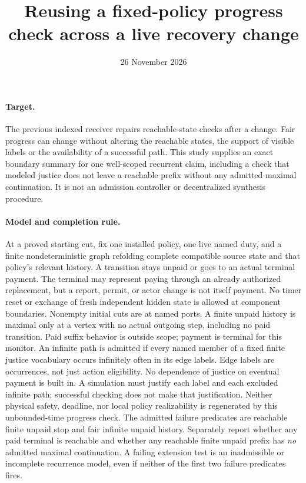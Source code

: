 \documentclass{article}
\title{Reusing a fixed-policy progress check across a live recovery change}
\date{26 November 2026}
\begin{document}
\maketitle
\paragraph{Target.}
The previous indexed receiver repairs reachable-state checks after a
change. Fair progress can change without altering the reachable states,
the support of visible labels or the availability of a successful path.
This study supplies an exact boundary summary for one well-scoped
recurrent claim, including a check that modeled justice does not leave a
reachable prefix without any admitted maximal continuation. It is not
an admission controller or decentralized synthesis procedure.

\paragraph{Model and completion rule.}
At a proved starting cut, fix one installed policy, one live named duty,
and a finite nondeterministic graph refolding complete compatible source
state and that policy's relevant history. A transition stays unpaid or
goes to an actual terminal payment. The terminal may represent paying
through an already authorized replacement, but a report, permit, or
actor change is not itself payment. No timer reset or exchange of fresh
independent hidden state is allowed at component boundaries. Nonempty
initial cuts are at named ports. A finite unpaid history is maximal
only at a vertex with no actual outgoing step, including no paid
transition. Paid suffix behavior is outside scope; payment is terminal
for this monitor. An infinite path is admitted if every named member
of a fixed finite justice vocabulary occurs infinitely often in its
edge labels. Edge labels are occurrences, not just action eligibility.
No dependence of justice on eventual payment is built in. A simulation
must justify each label and each excluded infinite path; successful
checking does not make that justification. Neither physical safety,
deadline, nor local policy realizability is regenerated by this
unbounded-time progress check.
The admitted failure predicates are reachable finite unpaid stop and
fair infinite unpaid history. Separately report whether any paid
terminal is reachable and whether any reachable finite unpaid prefix
has \emph{no} admitted maximal continuation. A failing extension
test is an inadmissible or incomplete recurrence model, even if neither
of the first two failure predicates fires.
\end{document}
